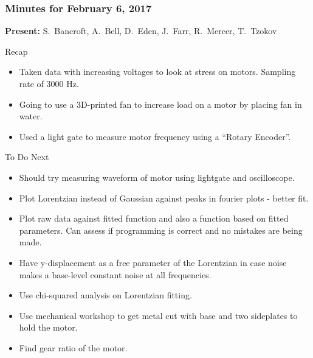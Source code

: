 \noindent\makebox[\linewidth]{\rule{0.7\textwidth}{0.4pt}} %

\subsubsection*{Minutes for February 6, 2017}

\textbf{Present:} 
{S.~Bancroft,
  A.~Bell,
  D.~Eden,
  J.~Farr,
  R.~Mercer,
  T.~Tzokov}
  
\large{Recap}
\begin{itemize}
\item
Taken data with increasing voltages to look at stress on motors. Sampling rate of 3000 Hz.

\item
Going to use a 3D-printed fan to increase load on a motor by placing fan in water.

\item
Used a light gate to measure motor frequency using a ``Rotary Encoder''.
\end{itemize}

\large{To Do Next}
\begin{itemize}
\item
Should try measuring waveform of motor using lightgate and oscilloscope.

\item
Plot Lorentzian instead of Gaussian against peaks in fourier plots - better fit.

\item
Plot raw data against fitted function and also a function based on fitted parameters. Can assess if programming is correct and no mistakes are being made.

\item
Have y-displacement as a free parameter of the Lorentzian in case noise makes a base-level constant noise at all frequencies.

\item
Use chi-squared analysis on Lorentzian fitting.

\item
Use mechanical workshop to get metal cut with base and two sideplates to hold the motor.

\item
Find gear ratio of the motor.

\end{itemize}

\noindent\makebox[\linewidth]{\rule{0.7\textwidth}{0.4pt}} \clearpage

